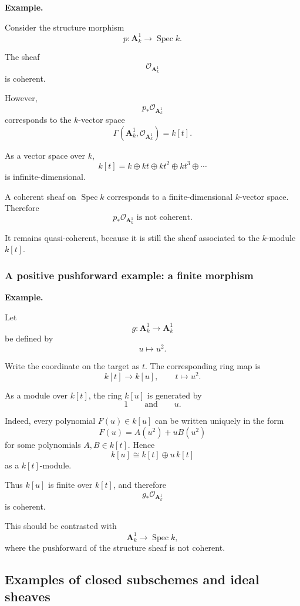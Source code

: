 \documentclass[12pt,a4paper]{article}
\theoremstyle{notespace}
\begin{document}
\textbf{Example.}

Consider the structure morphism
\[
p:\mathbf A^1_k\longrightarrow\operatorname{Spec}k.
\]

The sheaf
\[
\mathcal O_{\mathbf A^1_k}
\]
is coherent.

However,
\[
p_*\mathcal O_{\mathbf A^1_k}
\]
corresponds to the \(k\)-vector space
\[
\Gamma(\mathbf A^1_k,\mathcal O_{\mathbf A^1_k})
=
k[t].
\]

As a vector space over \(k\),
\[
k[t]
=
k\oplus kt\oplus kt^2\oplus kt^3\oplus\cdots
\]
is infinite-dimensional.

A coherent sheaf on \(\operatorname{Spec}k\) corresponds to a finite-dimensional \(k\)-vector space. Therefore
\[
\boxed{
	p_*\mathcal O_{\mathbf A^1_k}
	\text{ is not coherent.}
}
\]

It remains quasi-coherent, because it is still the sheaf associated to the \(k\)-module \(k[t]\).

\subsubsection{A positive pushforward example: a finite morphism}

\textbf{Example.}

Let
\[
g:\mathbf A^1_k\longrightarrow\mathbf A^1_k
\]
be defined by
\[
u\longmapsto u^2.
\]

Write the coordinate on the target as \(t\). The corresponding ring map is
\[
k[t]\longrightarrow k[u],
\qquad
t\longmapsto u^2.
\]

As a module over \(k[t]\), the ring \(k[u]\) is generated by
\[
1
\qquad\text{and}\qquad
u.
\]

Indeed, every polynomial \(F(u)\in k[u]\) can be written uniquely in the form
\[
F(u)=A(u^2)+uB(u^2)
\]
for some polynomials \(A,B\in k[t]\). Hence
\[
k[u]\cong k[t]\oplus u\,k[t]
\]
as a \(k[t]\)-module.

Thus \(k[u]\) is finite over \(k[t]\), and therefore
\[
g_*\mathcal O_{\mathbf A^1_k}
\]
is coherent.

This should be contrasted with
\[
\mathbf A^1_k\longrightarrow\operatorname{Spec}k,
\]
where the pushforward of the structure sheaf is not coherent.

\subsection{Examples of closed subschemes and ideal sheaves}
\end{document}
